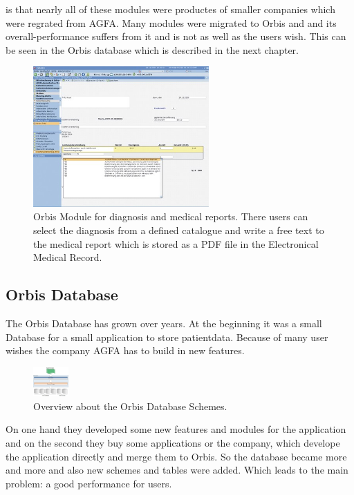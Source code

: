 \documentclass[a4paper]{article}
\begin{document}
	is that nearly all of these modules were productes of smaller companies which
	were regrated from AGFA. Many modules were migrated to Orbis and and its
	overall-performance suffers from it and is not as well as the users wish.
	This can be seen in the Orbis database which is described in the next chapter.\\
	\begin{figure}[!ht]
		  \centering
		      \includegraphics[width=0.6\textwidth]{orbis2}
		  \caption{Orbis Module for diagnosis and medical reports. There users can
		  select the diagnosis from a defined catalogue and write a free text to the
		  medical report which is stored as a PDF file in the Electronical Medical
		  Record.}
	\end{figure}
	\subsection{Orbis Database}
	The Orbis Database has grown over years. At the beginning it was a small
	Database for a small application to store patientdata. Because of many user
	wishes the company AGFA has to build in new features. \\
	\begin{figure}[!ht]
		  \centering
		      \includegraphics[width=0.12\textwidth]{orbis_db_schema}
		  \caption{Overview about the Orbis Database Schemes.}
	\end{figure}
	On one hand they developed some new features and modules for the application
	and on the second they buy some applications or the company, which develope the
	application directly and merge them to Orbis. So the database became more and
	more and also new schemes and tables were added. Which leads to the main
	problem: a good performance for users.
\end{document}
